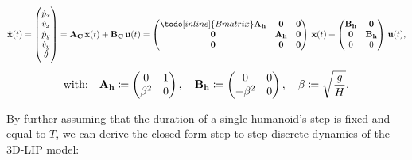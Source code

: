 \begin{equation} \notag
\mathbf{\dot{x}}(t) = 
\begin{pmatrix}
    \dot{p}_{x}\\
    \dot{v}_{x}\\
    \dot{p}_{y}\\
    \dot{v}_{y}\\
    \dot{\theta}
\end{pmatrix} =
\mathbf{A_C} \, \mathbf{x}(t) + \mathbf{B_C} \, \mathbf{u}(t) =
\begin{pmatrix}
    \todo[inline]{Bmatrix}
    \mathbf{A_h} & \mathbf{0} & \mathbf{0} \\
    \mathbf{0} & \mathbf{A_h} & \mathbf{0} \\
    \mathbf{0} & \mathbf{0} & \mathbf{0} \\
\end{pmatrix} \, \mathbf{x}(t) +
\begin{pmatrix}
    \mathbf{B_h} & \mathbf{0} \\
    \mathbf{0} & \mathbf{B_h} \\
    0 & 0 \\
\end{pmatrix} \, \mathbf{u}(t),
\end{equation}
\begin{equation} \notag
\text{with:}\quad
\mathbf{A_h} \coloneq
\begin{pmatrix}
    0 & 1 \\
    \beta^2 & 0
\end{pmatrix},
\quad
\mathbf{B_h} \coloneq
\begin{pmatrix}
    0 & 0 \\
    -\beta^2 & 0
\end{pmatrix}, \quad
\beta \coloneqq \sqrt{\frac{g}{H}}.
\end{equation}

By further assuming that the duration of a single humanoid's step is fixed and equal to $T$, we can derive the closed-form step-to-step discrete dynamics of the 3D-LIP model:


